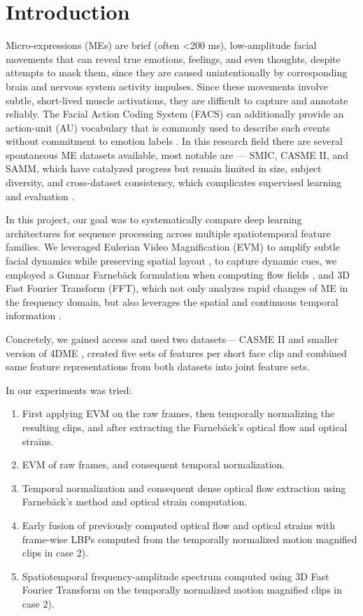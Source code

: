 \documentclass{article}
\begin{document}
\section{Introduction }
Micro-expressions (MEs) are brief (often <200 ms), low-amplitude facial movements that can reveal true emotions, feelings, and even thoughts, despite attempts to mask them, since they are caused unintentionally by corresponding brain and nervous system activity impulses. Since these movements involve subtle, short-lived muscle activations, they are difficult to capture and annotate reliably. The Facial Action Coding System (FACS) can additionally provide an action-unit (AU) vocabulary that is commonly used to describe such events without commitment to emotion labels \cite{clark2020}. In this research field there are several spontaneous ME datasets available, most notable are — SMIC, CASME II, and SAMM, which have catalyzed progress but remain limited in size, subject diversity, and cross-dataset consistency, which complicates supervised learning and evaluation \cite{yan2014}.

In this project, our goal was to systematically compare deep learning architectures for sequence processing across multiple spatiotemporal feature families. We leveraged Eulerian Video Magnification (EVM) to amplify subtle facial dynamics while preserving spatial layout \cite{farneback2003}, to capture dynamic cues, we employed a Gunnar Farnebäck formulation when computing flow fields \cite{zhao2007}, and 3D Fast Fourier Transform (FFT), which not only analyzes rapid changes of ME in the frequency domain, but also leverages the spatial and continuous temporal information \cite{li2022}.

Concretely, we gained access and used two datasets— CASME II \cite{yan2014} and smaller version of 4DME \cite{li2023}, created five sets of features per short face clip and combined same feature representations from both datasets into joint feature sets.

In our experiments was tried:

\begin{enumerate}
\item First applying EVM on the raw frames, then temporally normalizing the resulting clips, and after extracting the Farnebäck’s optical flow and optical strains.
\item EVM of raw frames, and consequent temporal normalization.
\item Temporal normalization and consequent dense optical flow extraction using Farnebäck’s method and optical strain computation.
\item  Early fusion of previously computed optical flow and optical strains with frame-wise LBPs computed from the temporally normalized motion magnified clips in case 2).
\item Spatiotemporal frequency-amplitude spectrum computed using 3D Fast Fourier Transform on the temporally normalized motion magnified clips in case 2).
\end{enumerate}
\end{document}

